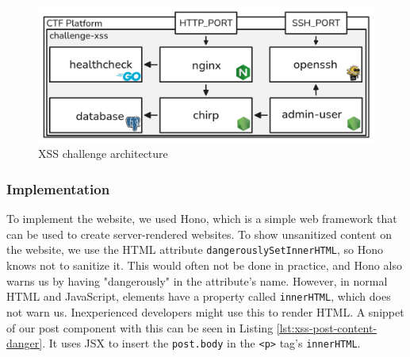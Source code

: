 \begin{figure}[H]
    \centering
    \includegraphics[width=0.9\linewidth]{img/challenge-xss--architecture.png}
    \caption{XSS challenge architecture}
    \label{fig:xss-architecure}
\end{figure}



\subsubsection{Implementation}

To implement the website, we used Hono\cite{github__hono}, which is a simple web framework that can be used to create server-rendered websites. To show unsanitized content on the website, we use the HTML attribute \texttt{dangerouslySetInnerHTML}, so Hono knows not to sanitize it. This would often not be done in practice, and Hono also warns us by having "dangerously" in the attribute's name. However, in normal HTML and JavaScript, elements have a property called \texttt{innerHTML}, which does not warn us. Inexperienced developers might use this to render HTML. A snippet of our post component with this can be seen in Listing \ref{lst:xss-post-content-danger}. It uses JSX to insert the \texttt{post.body} in the \texttt{<p>} tag's \texttt{innerHTML}. 

